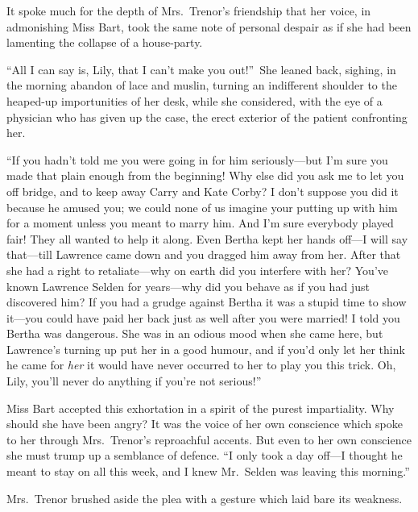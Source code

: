 \documentclass[12pt,a4paper]{book}
\begin{document}
It spoke much for the depth of Mrs.\ Trenor's friendship that her
voice, in admonishing Miss Bart, took the same note of personal
despair as if she had been lamenting the collapse of a
house-party.





``All I can say is, Lily, that I can't make you out!''\ She leaned
back, sighing, in the morning abandon of lace and muslin, turning
an indifferent shoulder to the heaped-up importunities of her
desk, while she considered, with the eye of a physician who has
given up the case, the erect exterior of the patient confronting
her.





``If you hadn't told me you were going in for him seriously---but
I'm sure you made that plain enough from the beginning! Why else
did you ask me to let you off bridge, and to keep away Carry and
Kate Corby? I don't suppose you did it because he amused you; we
could none of us imagine your putting up with him for a moment
unless you meant to marry him. And I'm sure everybody played
fair! They all wanted to help it along. Even Bertha kept her
hands off---I will say that---till Lawrence came down and you
dragged him away from her. After that she had a right to
retaliate---why on earth did you interfere with her? You've known
Lawrence Selden for years---why did you behave as if you had just
discovered him? If you had a grudge against Bertha it was a
stupid time to show it---you could have paid her back just as well
after you were married! I told you Bertha was dangerous. She was
in an odious mood when she came here, but Lawrence's turning up
put her in a good humour, and if you'd only let her think he came
for \textit{her} it would have never occurred to her to play you this
trick. Oh, Lily, you'll never do anything if you're not serious!''





Miss Bart accepted this exhortation in a spirit of the purest
impartiality. Why should she have been angry? It was the voice of
her own conscience which spoke to her through Mrs.\ Trenor's
reproachful accents. But even to her own conscience she must
trump up a semblance of defence. ``I only took a day off---I
thought he meant to stay on all this week, and I knew Mr.\ Selden
was leaving this morning.''





Mrs.\ Trenor brushed aside the plea with a gesture which laid bare
its weakness.
\end{document}
